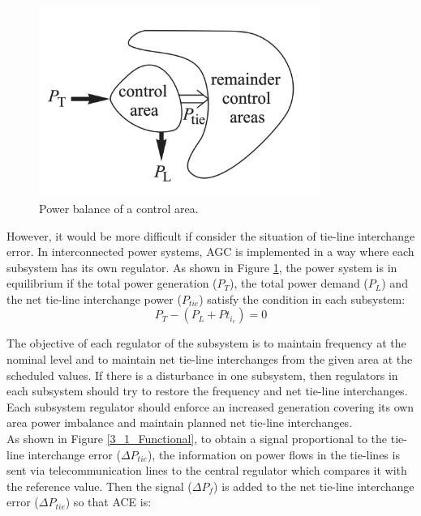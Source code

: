 \documentclass{report}
\begin{document}
\begin{figure}[htbp]
\centering
\includegraphics[width =0.819\textwidth]{figure/3_1_Power.png}
\caption{Power balance of a control area.}
\label{3_1_Power}
\end{figure}

However, it would be more difficult if consider the situation of tie-line interchange error. In interconnected power systems, AGC is implemented in a way where each subsystem has its own regulator. As shown in Figure \textcolor{red}{\ref{3_1_Power}}, the power system is in equilibrium if the total power generation ($P_T$), the total power demand ($P_L$) and the net tie-line interchange power ($P_{tie}$) satisfy the condition in each subsystem:\\

\begin{equation} \label{eq1}
 P_T - (P_L + P{t_i_e}) = 0
\end{equation}

The objective of each regulator of the subsystem is to maintain frequency at the nominal level and to maintain net tie-line interchanges from the given area at the scheduled values. If there is a disturbance in one subsystem, then regulators in each subsystem should try to restore the frequency and net tie-line interchanges. Each subsystem regulator should enforce an increased generation covering its own area power imbalance and maintain planned net tie-line interchanges.\\

As shown in Figure \textcolor{red}{\ref{3_1_Functional}}, to obtain a signal proportional to the tie-line interchange error ($\Delta P_{tie}$), the information on power ﬂows in the tie-lines is sent via telecommunication lines to the central regulator which compares it with the reference value. Then the signal ($\Delta P_f$) is added to the net tie-line interchange error ($\Delta P_{tie}$) so that ACE is: \\
\end{document}
